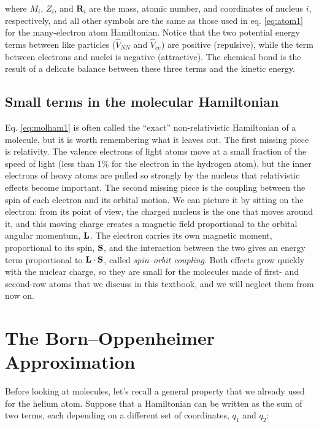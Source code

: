 \documentclass[
  english,
  9pt,
]{extbook}
\theoremstyle{definition}
\theoremstyle{definition}
\theoremstyle{definition}
\theoremstyle{definition}
\theoremstyle{remark}
\begin{document}
where \(M_i\), \(Z_i\), and \(\mathbf{R}_i\) are the mass, atomic number, and coordinates of nucleus \(i\), respectively, and all other symbols are the same as those used in eq. \eqref{eq:atom1} for the many-electron atom Hamiltonian. Notice that the two potential energy terms between like particles (\(\hat{V}_{NN}\) and \(\hat{V}_{ee}\)) are positive (repulsive), while the term between electrons and nuclei is negative (attractive). The chemical bond is the result of a delicate balance between these three terms and the kinetic energy.

\subsection{Small terms in the molecular Hamiltonian}\label{small-terms-in-the-molecular-hamiltonian}

Eq. \eqref{eq:molham1} is often called the ``exact'' non-relativistic Hamiltonian of a molecule, but it is worth remembering what it leaves out. The first missing piece is relativity. The valence electrons of light atoms move at a small fraction of the speed of light (less than 1\% for the electron in the hydrogen atom), but the inner electrons of heavy atoms are pulled so strongly by the nucleus that relativistic effects become important. The second missing piece is the coupling between the spin of each electron and its orbital motion. We can picture it by sitting on the electron: from its point of view, the charged nucleus is the one that moves around it, and this moving charge creates a magnetic field proportional to the orbital angular momentum, \({\bf L}\). The electron carries its own magnetic moment, proportional to its spin, \({\bf S}\), and the interaction between the two gives an energy term proportional to \({\bf L} \cdot {\bf S}\), called \emph{spin--orbit coupling}. Both effects grow quickly with the nuclear charge, so they are small for the molecules made of first- and second-row atoms that we discuss in this textbook, and we will neglect them from now on.

\section{The Born--Oppenheimer Approximation}\label{the-bornoppenheimer-approximation}

Before looking at molecules, let's recall a general property that we already used for the helium atom. Suppose that a Hamiltonian can be written as the sum of two terms, each depending on a different set of coordinates, \(q_1\) and \(q_2\):
\end{document}
